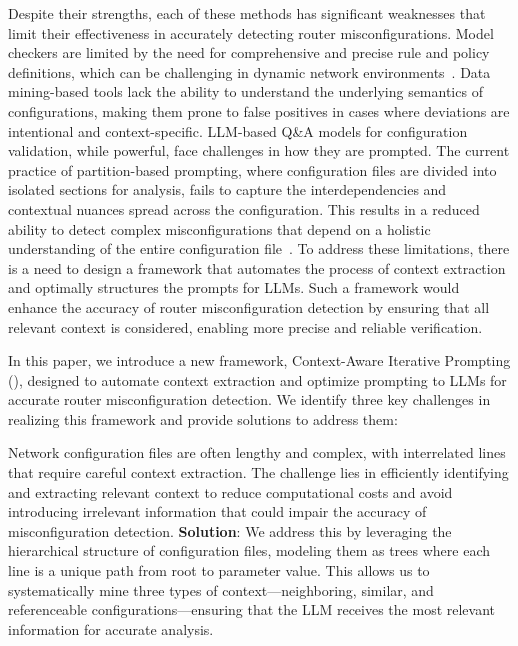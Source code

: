 Despite their strengths, each of these methods has significant weaknesses that limit their effectiveness in accurately detecting router misconfigurations. Model checkers are limited by the need for comprehensive and precise rule and policy definitions, which can be challenging in dynamic network environments~\cite{graf1990limits,baier2008principles}.
Data mining-based tools lack the ability to understand the underlying semantics of configurations, making them prone to false positives in cases where deviations are intentional and context-specific. LLM-based Q\&A models for configuration validation, while powerful, face challenges in how they are prompted. The current practice of partition-based prompting, where configuration files are divided into isolated sections for analysis, fails to capture the interdependencies and contextual nuances spread across the configuration. This results in a reduced ability to detect complex misconfigurations that depend on a holistic understanding of the entire configuration file~\cite{liskavets2024prompt,tian2024examining,khurana2024and,shvartzshnaider2024llm}. To address these limitations, there is a need to design a framework that automates the process of context extraction and optimally structures the prompts for LLMs. Such a framework would enhance the accuracy of router misconfiguration detection by ensuring that all relevant context is considered, enabling more precise and reliable verification.

In this paper, we introduce a new framework, Context-Aware Iterative Prompting (\sysname{}), designed to automate context extraction and optimize prompting to LLMs for accurate router misconfiguration detection. We identify three key challenges in realizing this framework and provide solutions to address them:

Network configuration files are often lengthy and complex, with interrelated lines that require careful context extraction. The challenge lies in efficiently identifying and extracting relevant context to reduce computational costs and avoid introducing irrelevant information that could impair the accuracy of misconfiguration detection. \textbf{Solution}: We address this by leveraging the hierarchical structure of configuration files, modeling them as trees where each line is a unique path from root to parameter value. This allows us to systematically mine three types of context—neighboring, similar, and referenceable configurations—ensuring that the LLM receives the most relevant information for accurate analysis.

